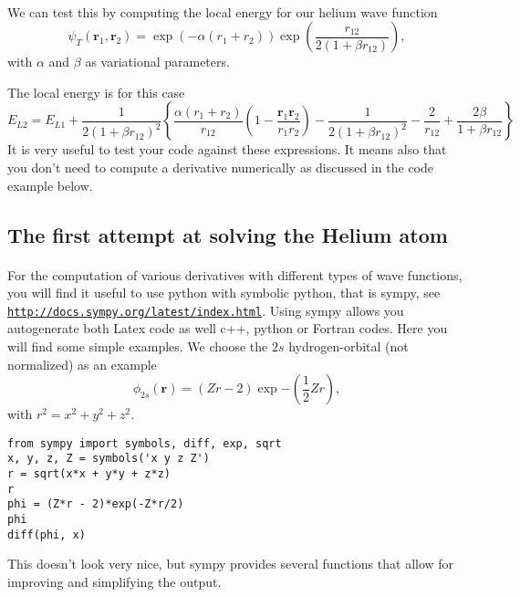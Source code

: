 \documentclass[%
twoside,                 %
final,                   %
10pt]{article}
\begin{document}
\paragraph{}

We can test this by computing the local energy for our helium wave function
\[
   \psi_{T}(\bm{r}_1,\bm{r}_2) = 
   \exp{\left(-\alpha(r_1+r_2)\right)}
   \exp{\left(\frac{r_{12}}{2(1+\beta r_{12})}\right)}, 
\]
with $\alpha$ and $\beta$ as variational parameters.

The local energy is for this case 
\[ 
E_{L2} = E_{L1}+\frac{1}{2(1+\beta r_{12})^2}\left\{\frac{\alpha(r_1+r_2)}{r_{12}}(1-\frac{\bm{r}_1\bm{r}_2}{r_1r_2})-\frac{1}{2(1+\beta r_{12})^2}-\frac{2}{r_{12}}+\frac{2\beta}{1+\beta r_{12}}\right\}
\]
It is very useful to test your code against these expressions. It means also that you don't need to
compute a derivative numerically as discussed in the code example below.



\subsection*{The first attempt at solving the Helium atom}

\paragraph{}
For the computation of various derivatives with different types of wave functions, you will find it useful to use python with symbolic python, that is sympy, see \href{{http://docs.sympy.org/latest/index.html}}{\nolinkurl{http://docs.sympy.org/latest/index.html}}.  Using sympy allows you autogenerate both Latex code as well c++, python or Fortran codes. Here you will find some simple examples. We choose 
the $2s$ hydrogen-orbital  (not normalized) as an example
\[
 \phi_{2s}(\bm{r}) = (Zr - 2)\exp{-(\frac{1}{2}Zr)},
\]
with $ r^2 = x^2 + y^2 + z^2$.

\begin{verbatim}
from sympy import symbols, diff, exp, sqrt
x, y, z, Z = symbols('x y z Z')
r = sqrt(x*x + y*y + z*z)
r
phi = (Z*r - 2)*exp(-Z*r/2)
phi
diff(phi, x)
\end{verbatim}
This doesn't look very nice, but sympy provides several functions that allow for improving and simplifying the output.
\end{document}
